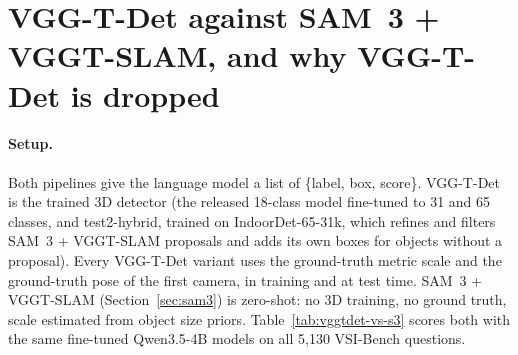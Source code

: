 
\section{VGG-T-Det against SAM~3 + VGGT-SLAM, and why VGG-T-Det is dropped}
\label{sec:vggtdet-results}

\paragraph{Setup.}
Both pipelines give the language model a list of \{label, box, score\}. VGG-T-Det is the trained 3D detector
(the released 18-class model fine-tuned to 31 and 65 classes, and test2-hybrid, trained on IndoorDet-65-31k, which
refines and filters SAM~3 + VGGT-SLAM proposals and adds its own boxes for objects without a proposal). Every VGG-T-Det variant uses the ground-truth metric scale and the ground-truth pose of the first camera,
in training and at test time. SAM~3 + VGGT-SLAM (Section~\ref{sec:sam3}) is zero-shot: no 3D training, no ground truth,
scale estimated from object size priors. Table~\ref{tab:vggtdet-vs-s3} scores both with the same fine-tuned
Qwen3.5-4B models on all 5,130 VSI-Bench questions.

